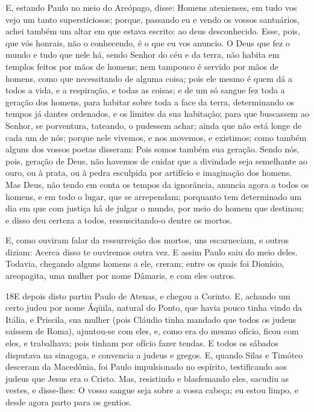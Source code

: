 E, estando Paulo no meio do Areópago, disse: Homens atenienses,
em tudo vos vejo um tanto supersticiosos; porque, passando eu
e vendo os vossos santuários, achei também um altar em que estava
escrito: ao deus desconhecido. Esse, pois, que vós honrais, não o
conhecendo, é o que eu vos anuncio. O Deus que fez o mundo e
tudo que nele há, sendo Senhor do céu e da terra, não habita em
templos feitos por mãos de homens; nem tampouco é servido por
mãos de homens, como que necessitando de alguma coisa; pois ele
mesmo é quem dá a todos a vida, e a respiração, e todas as coisas;
e de um só sangue fez toda a geração dos homens, para habitar
sobre toda a face da terra, determinando os tempos já dantes
ordenados, e os limites da sua habitação; para que buscassem
ao Senhor, se porventura, tateando, o pudessem achar; ainda que não
está longe de cada um de nós; porque nele vivemos, e nos
movemos, e existimos; como também alguns dos vossos poetas disseram:
Pois somos também sua geração. Sendo nós, pois, geração de
Deus, não havemos de cuidar que a divindade seja semelhante ao ouro,
ou à prata, ou à pedra esculpida por artifício e imaginação dos
homens. Mas Deus, não tendo em conta os tempos da ignorância,
anuncia agora a todos os homens, e em todo o lugar, que se
arrependam; porquanto tem determinado um dia em que com
justiça há de julgar o mundo, por meio do homem que destinou; e
disso deu certeza a todos, ressuscitando-o dentre os mortos.

E, como ouviram falar da ressurreição dos mortos, uns
escarneciam, e outros diziam: Acerca disso te ouviremos outra vez.
E assim Paulo saiu do meio deles. Todavia, chegando
alguns homens a ele, creram; entre os quais foi Dionísio,
areopagita, uma mulher por nome Dâmaris, e com eles outros.

\medskip

\lettrine{18} E depois disto partiu Paulo de Atenas, e chegou
a Corinto. E, achando um certo judeu por nome Áqüila, natural do
Ponto, que havia pouco tinha vindo da Itália, e Priscila, sua mulher
(pois Cláudio tinha mandado que todos os judeus saíssem de Roma),
ajuntou-se com eles, e, como era do mesmo ofício, ficou com
eles, e trabalhava; pois tinham por ofício fazer tendas. E todos
os sábados disputava na sinagoga, e convencia a judeus e gregos.
E, quando Silas e Timóteo desceram da Macedônia, foi Paulo
impulsionado no espírito, testificando aos judeus que Jesus era o
Cristo. Mas, resistindo e blasfemando eles, sacudiu as vestes, e
disse-lhes: O vosso sangue seja sobre a vossa cabeça; eu estou
limpo, e desde agora parto para os gentios.

